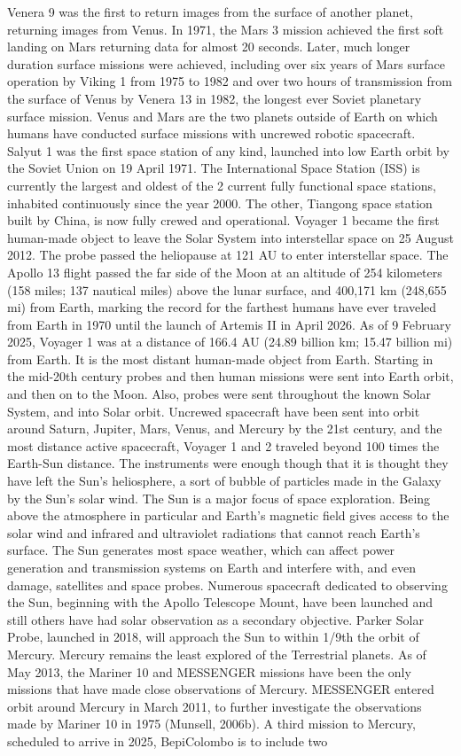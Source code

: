 \documentclass[12pt]{article}
\begin{document}
Venera 9 was the first to return images from the surface of another planet, returning images from Venus. In 1971, the Mars 3 mission achieved the first soft landing on Mars returning data for almost 20 seconds. Later, much longer duration surface missions were achieved, including over six years of Mars surface operation by Viking 1 from 1975 to 1982 and over two hours of transmission from the surface of Venus by Venera 13 in 1982, the longest ever Soviet planetary surface mission. Venus and Mars are the two planets outside of Earth on which humans have conducted surface missions with uncrewed robotic spacecraft. Salyut 1 was the first space station of any kind, launched into low Earth orbit by the Soviet Union on 19 April 1971. The International Space Station (ISS) is currently the largest and oldest of the 2 current fully functional space stations, inhabited continuously since the year 2000. The other, Tiangong space station built by China, is now fully crewed and operational. Voyager 1 became the first human-made object to leave the Solar System into interstellar space on 25 August 2012. The probe passed the heliopause at 121 AU to enter interstellar space. The Apollo 13 flight passed the far side of the Moon at an altitude of 254 kilometers (158 miles; 137 nautical miles) above the lunar surface, and 400,171 km (248,655 mi) from Earth, marking the record for the farthest humans have ever traveled from Earth in 1970 until the launch of Artemis II in April 2026. As of 9 February 2025, Voyager 1 was at a distance of 166.4 AU (24.89 billion km; 15.47 billion mi) from Earth. It is the most distant human-made object from Earth. Starting in the mid-20th century probes and then human missions were sent into Earth orbit, and then on to the Moon. Also, probes were sent throughout the known Solar System, and into Solar orbit. Uncrewed spacecraft have been sent into orbit around Saturn, Jupiter, Mars, Venus, and Mercury by the 21st century, and the most distance active spacecraft, Voyager 1 and 2 traveled beyond 100 times the Earth-Sun distance. The instruments were enough though that it is thought they have left the Sun's heliosphere, a sort of bubble of particles made in the Galaxy by the Sun's solar wind. The Sun is a major focus of space exploration. Being above the atmosphere in particular and Earth's magnetic field gives access to the solar wind and infrared and ultraviolet radiations that cannot reach Earth's surface. The Sun generates most space weather, which can affect power generation and transmission systems on Earth and interfere with, and even damage, satellites and space probes. Numerous spacecraft dedicated to observing the Sun, beginning with the Apollo Telescope Mount, have been launched and still others have had solar observation as a secondary objective. Parker Solar Probe, launched in 2018, will approach the Sun to within 1/9th the orbit of Mercury. Mercury remains the least explored of the Terrestrial planets. As of May 2013, the Mariner 10 and MESSENGER missions have been the only missions that have made close observations of Mercury. MESSENGER entered orbit around Mercury in March 2011, to further investigate the observations made by Mariner 10 in 1975 (Munsell, 2006b). A third mission to Mercury, scheduled to arrive in 2025, BepiColombo is to include two 
\end{document}
